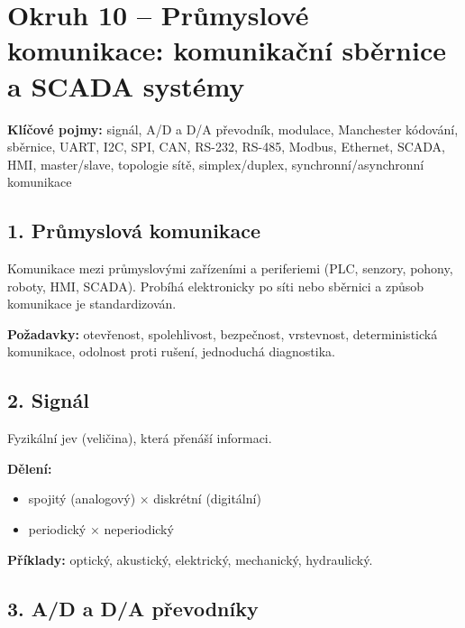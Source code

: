 \documentclass[a4paper,10pt]{article}
\begin{document}
\section*{\large Okruh 10 – Průmyslové komunikace: komunikační sběrnice a SCADA systémy}

\begin{pojmybox}
\textbf{Klíčové pojmy:}
signál, A/D a D/A převodník, modulace, Manchester kódování, sběrnice, UART, I2C, SPI, CAN,
RS-232, RS-485, Modbus, Ethernet, SCADA, HMI, master/slave, topologie sítě, simplex/duplex, synchronní/asynchronní komunikace
\end{pojmybox}

\begin{vysvetlenibox}

\subsection*{1. Průmyslová komunikace}

Komunikace mezi průmyslovými zařízeními a periferiemi (PLC, senzory, pohony, roboty, HMI, SCADA). Probíhá elektronicky po síti nebo sběrnici a způsob komunikace je standardizován.

\textbf{Požadavky:} otevřenost, spolehlivost, bezpečnost, vrstevnost, deterministická komunikace, odolnost proti rušení, jednoduchá diagnostika.

\subsection*{2. Signál}

Fyzikální jev (veličina), která přenáší informaci.

\textbf{Dělení:}
\begin{itemize}
  \item spojitý (analogový) × diskrétní (digitální)
  \item periodický × neperiodický
\end{itemize}
\textbf{Příklady:} optický, akustický, elektrický, mechanický, hydraulický.

\subsection*{3. A/D a D/A převodníky}


\end{vysvetlenibox}
\end{document}
